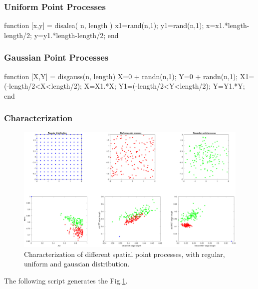 \subsubsection{Uniform Point Processes}
\begin{matlab}
function [x,y] = disalea( n, length )
x1=rand(n,1);
y1=rand(n,1);
x=x1.*length-length/2;
y=y1.*length-length/2;
end
\end{matlab}

\subsubsection{Gaussian Point Processes}
\begin{matlab}
function [X,Y] = disgauss(n, length)
X=0 + randn(n,1);
Y=0 + randn(n,1);
X1=(-length/2<X<length/2);
X=X1.*X;
Y1=(-length/2<Y<length/2);
Y=Y1.*Y;
end
\end{matlab}

\subsubsection{Characterization}

\begin{figure}[htbp]
 \centering
 \includegraphics[width=\textwidth]{distributions.pdf}
 \caption{Characterization of different spatial point processes, with regular, uniform and gaussian distribution.}
 \label{fig:point_process_voronoi:matlab:dist}
\end{figure}

The following script generates the Fig.\ref{fig:point_process_voronoi:matlab:dist}.

